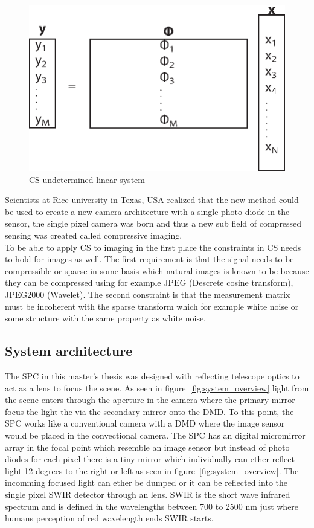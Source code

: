 \begin{figure}[H]
	\includegraphics[scale=0.5]{gfx/CS_eq.eps}
	\caption{CS undetermined linear system}
	\label{fig:CS_eq_sys}
\end{figure}



Scientists at Rice university in Texas, USA realized that the new method could be used to create a new camera architecture with a single photo diode in the sensor, the single pixel camera was born and thus a new sub field of compressed sensing was created called compressive imaging.\\[0.1in] 

To be able to apply CS to imaging in the first place the constraints in CS needs to hold for images as well. The first requirement is that the signal needs to be compressible or sparse in some basis which natural images is known to be because they can be compressed using for example JPEG (Descrete cosine transform), JPEG2000 (Wavelet). The second constraint is that the measurement matrix must be incoherent with the sparse transform which for example white noise or some structure with the same property as white noise.\\[0.1in]

\subsection{System architecture}
The SPC in this master's thesis was designed with reflecting telescope optics to act as a lens to focus the scene. As seen in figure~\ref{fig:system_overview} light from the scene enters through the aperture in the camera where the primary mirror focus the light the via the secondary mirror onto the DMD. To this point, the SPC works like a conventional camera with a DMD where the image sensor would be placed in the convectional camera. The SPC has an digital micromirror array in the focal point which resemble an image sensor but instead of photo diodes for each pixel there is a tiny mirror which individually can ether reflect light 12 degrees to the right or left as seen in figure~\ref{fig:system_overview}. The incomming focused light can ether be dumped or it can be reflected into the single pixel SWIR detector through an lens. SWIR is the short wave infrared spectrum and is defined in the wavelengths between 700 to 2500 nm just where humans perception of red wavelength ends SWIR starts.


